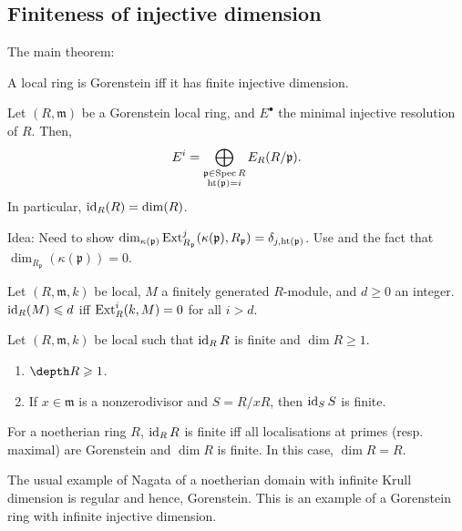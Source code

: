 \documentclass[12pt]{article}
\begin{document}
\subsection{Finiteness of injective dimension}
The main theorem:
\begin{thm}
	A local ring is Gorenstein iff it has finite injective dimension.
\end{thm}
\begin{thm}
	Let $(R, \mathfrak{m})$ be a Gorenstein local ring, and $E^{\bullet}$ the minimal injective resolution of $R$. Then, 
	\begin{equation*} 
		E^{i} = \bigoplus_{\substack{\mathfrak{p} \in \operatorname{Spec} R \\ \operatorname{ht}(\mathfrak{p}) = i}} E_{R}(R/\mathfrak{p}).
	\end{equation*}
	In particular, $\operatorname{id}_{R}(R) = \dim(R)$.
\end{thm}
Idea: Need to show $\dim_{\kappa(\mathfrak{p})} \operatorname{Ext}_{R_{\mathfrak{p}}}^{j}(\kappa(\mathfrak{p}), R_{\mathfrak{p}}) = \delta_{j, \operatorname{ht}(\mathfrak{p})}$. Use  and the fact that $\dim_{R_{\mathfrak{p}}}(\kappa(\mathfrak{p})) = 0$.

\begin{prop}
	Let $(R, \mathfrak{m}, k)$ be local, $M$ a finitely generated $R$-module, and $d \ge 0$ an integer. $\operatorname{id}_{R}(M) \leqslant d$ iff $\operatorname{Ext}_{R}^{i}(k, M) = 0$ for all $i > d$.
\end{prop}

\begin{lem} 
	Let $(R, \mathfrak{m}, k)$ be local such that $\operatorname{id}_{R} R$ is finite and $\dim R \ge 1$.
	\begin{enumerate}[label=(\alph*)]
		\item $\depth R \ge 1$.
		\item If $x \in \mathfrak{m}$ is a nonzerodivisor and $S = R/xR$, then $\operatorname{id}_{S} S$ is finite.
	\end{enumerate}
\end{lem}

\begin{thm}
	For a noetherian ring $R$, $\operatorname{id}_{R} R$ is finite iff all localisations at primes (resp. maximal) are Gorenstein and $\dim R$ is finite. In this case, $\dim R = R$.
\end{thm}

\begin{rem}
	The usual example of Nagata of a noetherian domain with infinite Krull dimension is regular and hence, Gorenstein. This is an example of a Gorenstein ring with infinite injective dimension.
\end{rem}
\end{document}
